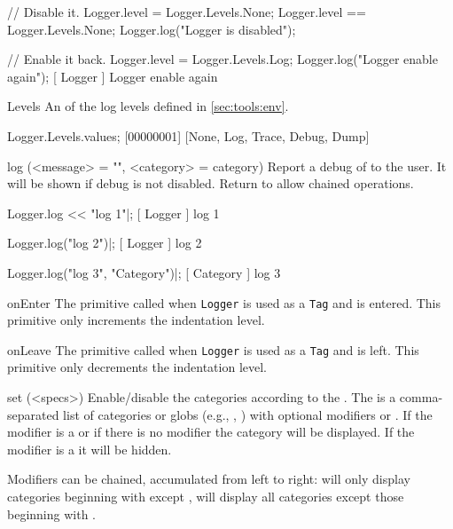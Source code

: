 \begin{urbiscriptapi}
\begin{urbiassert}
// Disable it.
Logger.level = Logger.Levels.None;
Logger.level == Logger.Levels.None;
Logger.log("Logger is disabled");

// Enable it back.
Logger.level = Logger.Levels.Log;
Logger.log("Logger enable again");
[        Logger         ] Logger enable again
\end{urbiassert}


\item[Levels]%
  An  of the log levels defined in
  \autoref{sec:tools:env}.

\begin{urbiscript}
Logger.Levels.values;
[00000001] [None, Log, Trace, Debug, Dump]
\end{urbiscript}


\item[log](<message> = "", <category> = category)%
  Report a debug  of  to the user. It will be
  shown if debug is not disabled. Return \this to allow chained operations.
\begin{urbiscript}
Logger.log << "log 1"|;
[       Logger        ] log 1

Logger.log("log 2")|;
[       Logger        ] log 2

Logger.log("log 3", "Category")|;
[      Category       ] log 3
\end{urbiscript}


\item[onEnter]%
  The primitive called when \lstinline|Logger| is used as a \lstinline|Tag|
  and is entered. This primitive only increments the indentation level.


\item[onLeave]%
  The primitive called when \lstinline|Logger| is used as a \lstinline|Tag|
  and is left. This primitive only decrements the indentation level.


\item[set](<specs>)%
  Enable/disable the categories according to the .  The
   is a comma-separated list of categories or globs (e.g.,
  , ) with optional modifiers \samp{+} or
  \samp{-}.  If the modifier is a \samp{+} or if there is no modifier the
  category will be displayed.  If the modifier is a \samp{-} it will be
  hidden.

  Modifiers can be chained, accumulated from left to right:
   will only display categories beginning with
   except ,  will display all
  categories except those beginning with .


\end{urbiscriptapi}

